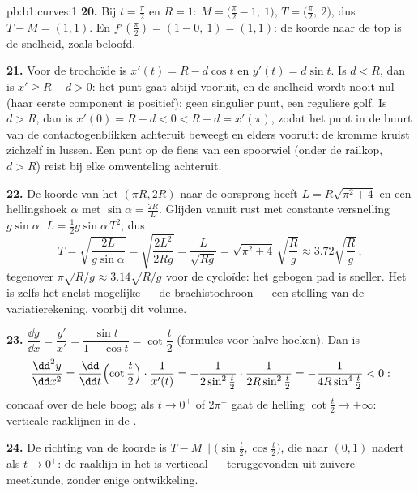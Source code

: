 \begin{solution}{pb:b1:curves:1}
\textbf{20.} Bij $t = \frac\pi2$ en $R = 1$: $M = \bigl(\frac\pi2 -
1,\ 1\bigr)$, $T = \bigl(\frac\pi2,\ 2\bigr)$, dus $T - M = (1,
1)$. En $f'(\frac\pi2) = (1 - 0,\ 1) = (1, 1)$: de koorde naar de
top is de snelheid, zoals beloofd.

\textbf{21.} Voor de trochoïde is $x'(t) = R - d\cos t$ en $y'(t) =
d\sin t$. Is $d < R$, dan is $x' \geq R - d > 0$: het punt gaat
altijd vooruit, en de snelheid wordt nooit nul (haar eerste
component is positief): geen singulier punt, een reguliere golf. Is
$d > R$, dan is $x'(0) = R - d < 0 < R + d = x'(\pi)$, zodat het
punt in de buurt van de contactogenblikken achteruit beweegt en
elders vooruit: de kromme kruist zichzelf in lussen. Een punt op de
flens van een spoorwiel (onder de railkop, $d > R$) reist bij elke
omwenteling achteruit.

\textbf{22.} De koorde van het  $(\pi R, 2R)$ naar de
oorsprong heeft  $L = R\sqrt{\pi^2 + 4}$ en een hellingshoek
$\alpha$ met $\sin\alpha = \frac{2R}{L}$. Glijden vanuit rust met
constante versnelling $g\sin\alpha$: $L = \frac12
g\sin\alpha\,T^2$, dus
\[
T = \sqrt{\frac{2L}{g\sin\alpha}} = \sqrt{\frac{2L^2}{2Rg}}
= \frac{L}{\sqrt{Rg}} = \sqrt{\pi^2 + 4}\,\sqrt{\frac Rg}
\approx 3.72\sqrt{\frac Rg}\,,
\]
tegenover $\pi\sqrt{R/g} \approx 3.14\sqrt{R/g}$ voor de cycloïde:
het gebogen pad is sneller. Het is zelfs het snelst mogelijke ---
de brachistochroon --- een stelling van de variatierekening,
voorbij dit volume.

\textbf{23.} $\dfrac{\dd y}{\dd x} = \dfrac{y'}{x'} = \dfrac{\sin
t}{1 - \cos t} = \cot\dfrac t2$ (formules voor halve hoeken). Dan
is
\[
\frac{\dd^2y}{\dd x^2}
= \frac{\dd}{\dd t}\Bigl(\cot\frac t2\Bigr)\cdot\frac{1}{x'(t)}
= -\frac{1}{2\sin^2\frac t2}\cdot\frac{1}{2R\sin^2\frac t2}
= -\frac{1}{4R\sin^4\frac t2} < 0 :
\]
concaaf over de hele boog; als $t \to 0^+$ of $2\pi^-$ gaat de
helling $\cot\frac t2 \to \pm\infty$: verticale raaklijnen in de
.

\textbf{24.} De richting van de koorde is $T - M \parallel
\bigl(\sin\frac t2, \cos\frac t2\bigr)$, die naar $(0, 1)$ nadert
als $t \to 0^{+}$: de raaklijn in het  is verticaal ---
teruggevonden uit zuivere meetkunde, zonder enige ontwikkeling.


\end{solution}
